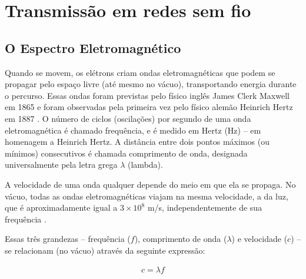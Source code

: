 \chapter{Transmissão em redes sem fio}
\label{cap:transmissao-redes-sem-fio}

\section{O Espectro Eletromagnético}
\label{sec:espectro-eletromagnetico}

Quando se movem, os elétrons criam ondas eletromagnéticas que podem se propagar pelo espaço livre (até mesmo no vácuo), transportando energia durante o percurso. Essas ondas foram previstas pelo físico inglês James Clerk Maxwell em 1865 e foram observadas pela primeira vez pelo físico alemão Heinrich Hertz em 1887 \cite{tanenbaum2011}. O número de ciclos (oscilações) por segundo de uma onda eletromagnética é chamado frequência, e é medido em Hertz (Hz) -- em homenagem a Heinrich Hertz. A distância entre dois pontos máximos (ou mínimos) consecutivos é chamada comprimento de onda, designada universalmente pela letra grega $\lambda$ (lambda).

A velocidade de uma onda qualquer depende do meio em que ela se propaga. No vácuo, todas as ondas eletromagnéticas viajam na mesma velocidade, a da luz, que é aproximadamente igual a $3 \times 10^8$ m/s, independentemente de sua frequência \cite{tanenbaum2011}.

Essas três grandezas -- frequência ($f$), comprimento de onda ($\lambda$) e velocidade ($c$) -- se relacionam (no vácuo) através da seguinte expressão:

\begin{equation}
	\begin{aligned}
		c = \lambda f
	\end{aligned}
\end{equation}

\begin{figure}[H]
	\centering
\end{figure}

